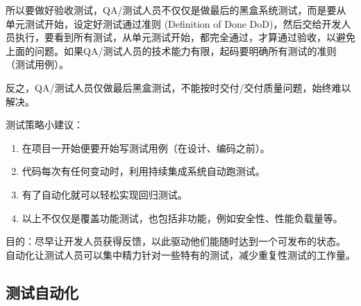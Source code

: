 所以要做好验收测试，QA/测试人员不仅仅是做最后的黑盒系统测试，而是要从单元测试开始，设定好测试通过准则
(Definition of Done
DoD)，然后交给开发人员执行，要看到所有测试，从单元测试开始，都完全通过，才算通过验收，以避免上面的问题。如果QA/测试人员的技术能力有限，起码要明确所有测试的准则（测试用例）。

反之，QA/测试人员仅做最后黑盒测试，不能按时交付/交付质量问题，始终难以解决。

测试策略小建议：

\begin{enumerate}
\tightlist
\item
  在项目一开始便要开始写测试用例（在设计、编码之前）。
\item
  代码每次有任何变动时，利用持续集成系统自动跑测试。
\item
  有了自动化就可以轻松实现回归测试。
\item
  以上不仅仅是覆盖功能测试，也包括非功能，例如安全性、性能负载量等。
\end{enumerate}

目的：尽早让开发人员获得反馈，以此驱动他们能随时达到一个可发布的状态。\\
自动化让测试人员可以集中精力针对一些特有的测试，减少重复性测试的工作量。

\hypertarget{ux6d4bux8bd5ux81eaux52a8ux5316}{%
\subsection{测试自动化}\label{ux6d4bux8bd5ux81eaux52a8ux5316}}



